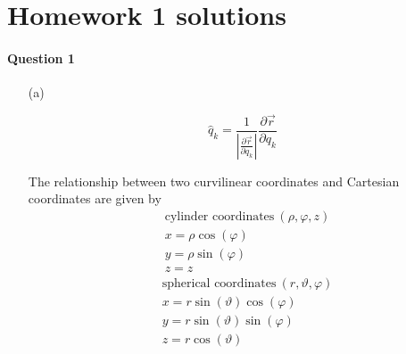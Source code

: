 \documentclass[11pt,a4paper]{article}
\author{Zehao Gao}
\begin{document}
\section{Homework 1 solutions}

\paragraph{Question 1}

\begin{enumerate}
\item[(a)]

\begin{equation}
\hat{q}_k=\frac{1}{|\frac{\partial\vec{r}}{\partial q_k}|}\frac{\partial\vec{r}}{\partial q_k}
\end{equation}

The relationship between two curvilinear coordinates and Cartesian coordinates are given by
\begin{align*}
&\textrm{cylinder coordinates}\ (\rho,\varphi,z)\\
&x=\rho\cos(\varphi)\\
&y=\rho\sin(\varphi)\\
&z=z
\end{align*}
\begin{align*}
&\textrm{spherical coordinates}\ (r,\vartheta,\varphi)\\
&x=r\sin(\vartheta)\cos(\varphi)\\
&y=r\sin(\vartheta)\sin(\varphi)\\
&z=r\cos(\vartheta)
\end{align*}


\end{enumerate}
\end{document}
